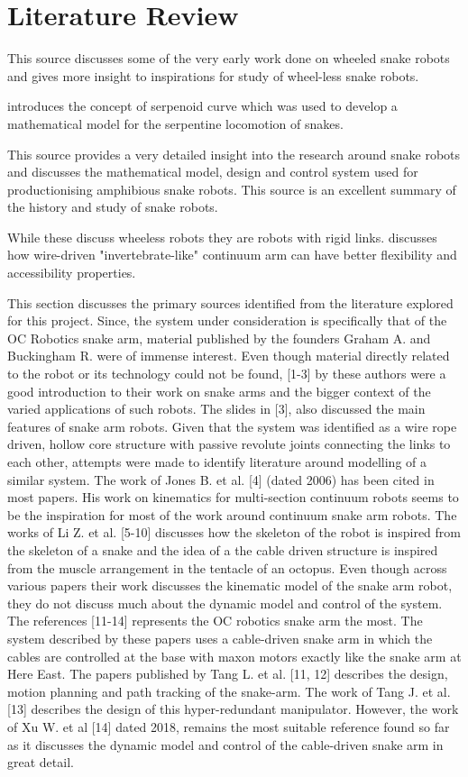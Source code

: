 \documentclass[a4paper,12pt]{report}
\begin{document}
\section{Literature Review}

\cite{saito2002modeling}
This source discusses some of the very early work done on wheeled snake robots and gives more insight to inspirations for study of wheel-less snake robots.

\cite{1521742}
introduces the concept of serpenoid curve which was used to develop a mathematical model for the serpentine locomotion of snakes.

\cite{pettersen2017snake} 
This source provides a very detailed insight into the research around snake robots and discusses the mathematical model, design and control system used for productionising amphibious snake robots. This source is an excellent summary of the history and study of snake robots.

While these discuss wheeless robots they are robots with rigid links. \cite{Zhou2018AnalysisOU} discusses how wire-driven "invertebrate-like" continuum arm can have better flexibility and accessibility properties.

This section discusses the primary sources identified from the literature explored for this project.
Since, the system under consideration is specifically that of the OC Robotics snake arm, material published by the founders Graham A. and Buckingham R. were of immense interest. Even though material directly related to the robot or its technology could not be found, [1-3] by these authors were a good introduction to their work on snake arms and the bigger context of the  varied applications of such robots. The slides in [3], also discussed the main features of  snake arm robots.
Given that the system was identified as a wire rope driven, hollow core structure with passive revolute joints connecting the links to each other, attempts were made to identify literature around modelling of a similar system. The work of Jones B. et al. [4] (dated 2006) has been cited in most papers. His work on kinematics for multi-section continuum robots seems to be the inspiration for most of the work around continuum snake arm robots. The works of Li Z. et al. [5-10] discusses how the skeleton of the robot is inspired from the skeleton of a snake and the idea of a the cable driven structure is inspired from the muscle arrangement in the tentacle of an octopus. Even though across various papers their work discusses the kinematic model of the snake arm robot, they do not discuss much about the dynamic model and control of the system. The references [11-14] represents the OC robotics snake arm the most. The system described by these papers uses a cable-driven snake arm in which the cables are controlled at the base with maxon motors exactly like the snake arm at Here East. The papers published by Tang L. et al. [11, 12] describes the design, motion planning and path tracking of the snake-arm. The work of Tang J. et al. [13] describes the design of this hyper-redundant manipulator. However, the work of Xu W. et al [14] dated 2018, remains the most suitable reference found so far as it discusses the dynamic model and control of the cable-driven snake arm in great detail. 
\end{document}

